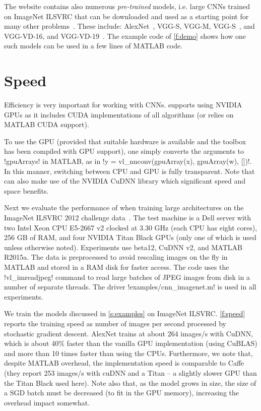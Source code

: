 The \matconvnet website contains also numerous \emph{pre-trained} models, i.e. large CNNs trained on ImageNet ILSVRC that can be downloaded and used as a starting point for many other problems~\cite{chatfield14return}. These include: AlexNet~\cite{krizhevsky12imagenet}, VGG-S, VGG-M,  VGG-S~\cite{chatfield14return}, and  VGG-VD-16, and VGG-VD-19~\cite{simonyan14very}.  The example code of \autoref{f:demo} shows how one such models can be used in a few lines of MATLAB code.

\section{Speed}\label{s:speed}

Efficiency is very important for working with CNNs. \matconvnet supports  using NVIDIA GPUs as it includes CUDA implementations of all algorithms (or relies on MATLAB CUDA support). 

 To use the GPU (provided that suitable hardware is available and the toolbox has been compiled with GPU support), one simply converts the arguments to !gpuArrays! in MATLAB, as in !y = vl_nnconv(gpuArray(x), gpuArray(w), [])!. In this manner, switching between CPU and GPU is fully transparent. Note that \matconvnet can also make use of the NVIDIA CuDNN library which significant speed and space benefits.
 
Next we evaluate the performance of \matconvnet when training large architectures on the ImageNet ILSVRC 2012 challenge data~\cite{deng09imagenet}. The test machine is a Dell server with two Intel Xeon CPU E5-2667 v2 clocked at 3.30 GHz (each CPU has eight cores), 256 GB of RAM, and four NVIDIA Titan Black GPUs (only one of which is used unless otherwise noted). Experiments use \matconvnet beta12, CuDNN v2, and MATLAB R2015a. The data is preprocessed to avoid rescaling images on the fly in MATLAB and stored in a RAM disk for faster access. The code uses the !vl_imreadjpeg! command to read large batches of JPEG images from disk in a number of separate threads. The driver !examples/cnn_imagenet.m! is used in all experiments.

 We train the models discussed in \autoref{s:examples} on ImageNet ILSVRC. \autoref{f:speed} reports the training speed as number of images per second processed by stochastic gradient descent. AlexNet trains at about 264 images/s with CuDNN, which is about 40\% faster than the vanilla GPU implementation (using CuBLAS) and more than 10 times faster than using the CPUs. Furthermore, we note that, despite MATLAB overhead, the implementation speed is comparable to Caffe (they report 253 images/s with cuDNN and a Titan -- a slightly slower GPU than the Titan Black used here).  Note also that, as the model grows in size, the size of a SGD batch must be decreased (to fit in the GPU memory), increasing the overhead impact somewhat.
 
